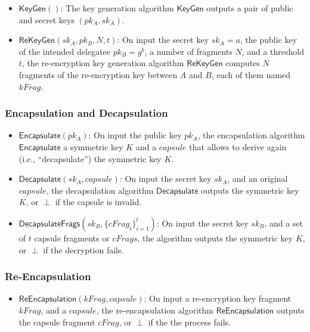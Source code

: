 \documentclass{amsart}
\providecommand{\pk}[1]{pk_{#1}}
\providecommand{\sk}[1]{sk_{#1}}
\begin{document}
\begin{itemize}

	\item $\mathsf{KeyGen}()$: The key generation algorithm $\mathsf{KeyGen}$ outputs a pair of public and secret keys $(\pk{A}, \sk{A})$.
	\item $\mathsf{ReKeyGen}(sk_A, pk_B, N, t)$: On input the secret key $sk_{A} = a$, the public key of the intended delegatee $pk_{B} = g^b$, a number of fragments $N$, and a threshold $t$, the re-encryption key generation algorithm $\mathsf{ReKeyGen}$ computes $N$ fragments of the re-encryption key between $A$ and $B$, each of them named $kFrag$. 
\end{itemize}


\subsubsection{Encapsulation and Decapsulation}

\begin{itemize}
	\item $\mathsf{Encapsulate}(pk_A)$: On input the public key $pk_A$, the encapsulation algorithm $\mathsf{Encapsulate}$ a symmetric key $K$ and a $capsule$ that allows to derive again (i.e., ``decapsulate'') the symmetric key $K$. 
	
	\item $\mathsf{Decapsulate}(sk_A, capsule)$: On input the secret key $sk_A$, and an original $capsule$, the decapsulation algorithm $\mathsf{Decapsulate}$ outputs the symmetric key $K$, or $\perp$ if the capsule is invalid. 
	
	\item $\mathsf{DecapsulateFrags}(sk_B, \{cFrag_i\}_{i=1}^t)$: On input the secret key $sk_B$, and a set of $t$ capsule fragments or $cFrags$, the algorithm outputs the symmetric key $K$, or $\perp$ if the decryption fails. 
	
\end{itemize}

\subsubsection{Re-Encapsulation}%

\begin{itemize}
\item $\mathsf{ReEncapsulation}(kFrag, capsule)$: On input a re-encryption key fragment $kFrag$, and a $capsule$, the re-encapsulation algorithm $\mathsf{ReEncapsulation}$ outputs the capsule fragment $cFrag$, or $\perp$ if the the process fails.

\end{itemize}
\end{document}
